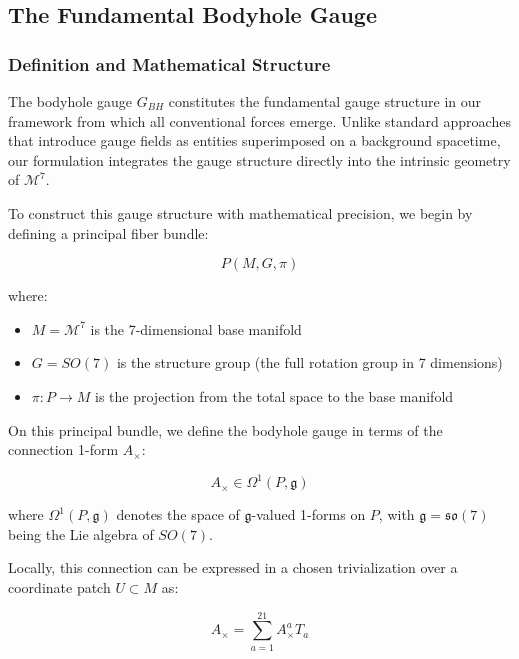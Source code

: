 \documentclass{article}
\begin{document}
\subsection{The Fundamental Bodyhole Gauge}

\subsubsection{Definition and Mathematical Structure}

The bodyhole gauge $G_{BH}$ constitutes the fundamental gauge structure in our framework from which all conventional forces emerge. Unlike standard approaches that introduce gauge fields as entities superimposed on a background spacetime, our formulation integrates the gauge structure directly into the intrinsic geometry of $\mathcal{M}^7$.

To construct this gauge structure with mathematical precision, we begin by defining a principal fiber bundle:

\begin{equation}
P(M, G, \pi)
\end{equation}

where:
\begin{itemize}
\item $M = \mathcal{M}^7$ is the 7-dimensional base manifold
\item $G = SO(7)$ is the structure group (the full rotation group in 7 dimensions)
\item $\pi: P \rightarrow M$ is the projection from the total space to the base manifold
\end{itemize}

On this principal bundle, we define the bodyhole gauge in terms of the connection 1-form $A_{\times}$:

\begin{equation}
A_{\times} \in \Omega^1(P, \mathfrak{g})
\end{equation}

where $\Omega^1(P, \mathfrak{g})$ denotes the space of $\mathfrak{g}$-valued 1-forms on $P$, with $\mathfrak{g} = \mathfrak{so}(7)$ being the Lie algebra of $SO(7)$.

Locally, this connection can be expressed in a chosen trivialization over a coordinate patch $U \subset M$ as:

\begin{equation}
A_{\times} = \sum_{a=1}^{21} A^a_{\times} T_a
\end{equation}
\end{document}
